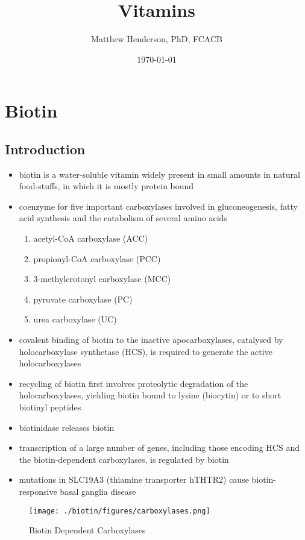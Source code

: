 \documentclass{scrartcl}
\author{Matthew Henderson, PhD, FCACB}
\date{\today}
\title{Vitamins}
\begin{document}
\maketitle
\setcounter{tocdepth}{2}
\tableofcontents


\section{Biotin}
\label{sec:org15fb8f5}
\subsection{Introduction}
\label{sec:orgf8943a1}
\begin{itemize}
\item biotin is a water-soluble vitamin widely present in small amounts in
natural food-stuffs, in which it is mostly protein bound
\item coenzyme for five important carboxylases involved in
gluconeogenesis, fatty acid synthesis and the catabolism of several
amino acids
\begin{enumerate}
\item acetyl-CoA carboxylase (ACC)
\item propionyl-CoA carboxylase (PCC)
\item 3-methylcrotonyl carboxylase (MCC)
\item pyruvate carboxylase (PC)
\item urea carboxylase (UC)
\end{enumerate}
\item covalent binding of biotin to the inactive apocarboxylases,
catalysed by holocarboxylase synthetase (HCS), is required to
generate the active holocarboxylases
\item recycling of biotin first involves proteolytic degradation of the
holocarboxylases, yielding biotin bound to lysine (biocytin) or to
short biotinyl peptides
\item biotinidase releases biotin
\item transcription of a large number of genes, including those encoding
HCS and the biotin-dependent carboxylases, is regulated by biotin
\item mutations in SLC19A3 (thiamine transporter hTHTR2) cause
biotin-responsive basal ganglia disease
\end{itemize}

\begin{figure}[htbp]
\centering
\texttt{[image: ./biotin/figures/carboxylases.png]}
\caption{\label{fig:org1e50d75}
Biotin Dependent Carboxylases}
\end{figure}
\end{document}
